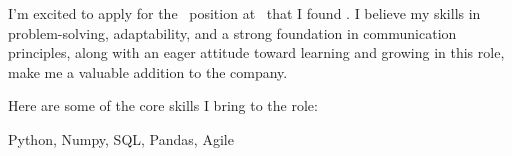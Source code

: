 \newcommand{\skills}{
        Python, 
        Numpy, 
        SQL, 
        Pandas, 
        Agile 
}


I'm excited to apply for the \position\ position at \company\ that I found \source. 
I believe my skills in problem-solving, adaptability, and a strong foundation in communication principles, along with an eager attitude toward learning and growing in this role, make me a valuable addition to the company.

Here are some of the core skills I bring to the role:
\skills
